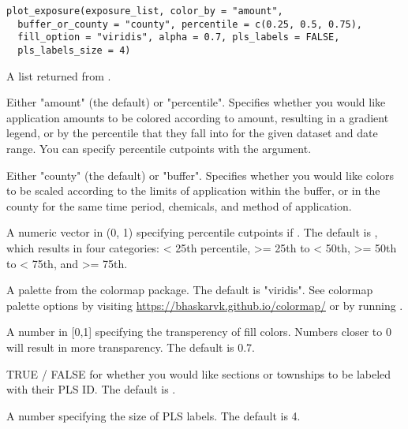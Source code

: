 \documentclass[a4paper]{book}
\begin{document}
%
\begin{Usage}
\begin{verbatim}
plot_exposure(exposure_list, color_by = "amount",
  buffer_or_county = "county", percentile = c(0.25, 0.5, 0.75),
  fill_option = "viridis", alpha = 0.7, pls_labels = FALSE,
  pls_labels_size = 4)
\end{verbatim}
\end{Usage}
%
\begin{Arguments}
\begin{ldescription}
\item[\code{exposure\_list}] A list returned from .

\item[\code{color\_by}] Either "amount" (the default) or "percentile". Specifies
whether you would like application amounts to be colored according to
amount, resulting in a gradient legend, or by the percentile that they fall
into for the given dataset and date range. You can specify percentile
cutpoints with the  argument.

\item[\code{buffer\_or\_county}] Either "county" (the default) or "buffer". Specifies
whether you would like colors to be scaled according to the limits
of application within the buffer, or in the county for the same time period,
chemicals, and method of application.

\item[\code{percentile}] A numeric vector in (0, 1) specifying percentile cutpoints
if . The default is ,
which results in four categories: < 25th percentile, >= 25th to < 50th,
>= 50th to < 75th, and >= 75th.

\item[\code{fill\_option}] A palette from the colormap package. The default is
"viridis". See colormap palette options by visiting
\url{https://bhaskarvk.github.io/colormap/} or by running
.

\item[\code{alpha}] A number in [0,1] specifying the transperency of fill colors.
Numbers closer to 0 will result in more transparency. The default is 0.7.

\item[\code{pls\_labels}] TRUE / FALSE for whether you would like sections or townships
to be labeled with their PLS ID. The default is .

\item[\code{pls\_labels\_size}] A number specifying the size of PLS labels. The default
is 4.
\end{ldescription}
\end{Arguments}
\end{document}
